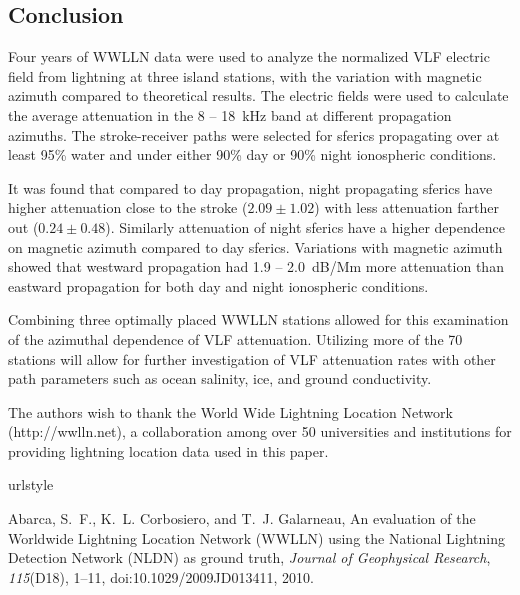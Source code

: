 \documentclass[draft,jgrga]{AGUTeX}
\begin{document}
\begin{article}
\section{Conclusion}

Four years of WWLLN data were used to analyze the normalized VLF electric field from lightning at three island stations, with the variation with magnetic azimuth compared to theoretical results.
The electric fields were used to calculate the average attenuation in the 8 -- 18~kHz band at different propagation azimuths.
The stroke-receiver paths were selected for sferics propagating over at least 95\% water and under either 90\% day or 90\% night ionospheric conditions.

It was found that compared to day propagation, night propagating sferics have higher attenuation close to the stroke ($2.09\pm1.02$) with less attenuation farther out ($0.24\pm0.48$).
Similarly attenuation of night sferics have a higher dependence on magnetic azimuth compared to day sferics.
Variations with magnetic azimuth showed that westward propagation had 1.9 -- 2.0~dB/Mm more attenuation than eastward propagation for both day and night ionospheric conditions.

Combining three optimally placed WWLLN stations allowed for this examination of the azimuthal dependence of VLF attenuation.
Utilizing more of the 70 stations will allow for further investigation of VLF attenuation rates with other path parameters such as ocean salinity, ice, and ground conductivity.

\begin{acknowledgments}
The authors wish to thank the World Wide Lightning Location Network  (http://wwlln.net), a collaboration among over 50 universities and institutions for providing lightning location data used in this paper.
\end{acknowledgments}

\begin{thebibliography}{12}
\providecommand{\natexlab}[1]{#1}
\expandafter\ifx\csname urlstyle\endcsname\relax
  \providecommand{\doi}[1]{doi:\discretionary{}{}{}#1}\else
  \providecommand{\doi}{doi:\discretionary{}{}{}\begingroup
  \urlstyle{rm}\Url}\fi

Abarca, S.~F., K.~L. Corbosiero, and T.~J. Galarneau, {An evaluation of the
  Worldwide Lightning Location Network (WWLLN) using the National Lightning
  Detection Network (NLDN) as ground truth}, \textit{Journal of Geophysical
  Research}, \textit{115}(D18), 1--11, \doi{10.1029/2009JD013411}, 2010.


\end{thebibliography}
\end{article}
\end{document}
